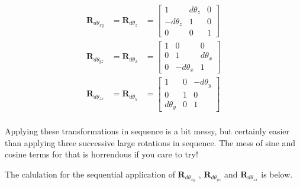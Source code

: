 \documentclass{article}      %
\newcommand{\BR}[0]{\mathbf{R}}
\begin{document}
\begin{align*}
\BR_{d\theta_{xy}}
&=
\BR_{d\theta_z}
&=
\begin{bmatrix}
1 & d\theta_z & 0 \\
-d\theta_z & 1 & 0 \\
0 & 0 & 1
\end{bmatrix} \\
\BR_{d\theta_{yz}}
&=
\BR_{d\theta_x}
&=
\begin{bmatrix}
 1 & 0 & 0 \\
 0 & 1 & d\theta_x \\
 0 & -d\theta_x & 1
\end{bmatrix} \\
\BR_{d\theta_{zx}}
&=
\BR_{d\theta_y}
&=
\begin{bmatrix}
 1 & 0 & -d\theta_y \\
 0 & 1 & 0 \\
 d\theta_y & 0 & 1
\end{bmatrix} \\
\end{align*}

Applying these transformations in sequence is a bit messy, but certainly easier than
applying three successive large rotations in sequence.  The mess of sine and cosine terms
for that is horrendous if you care to try!

The calulation for the sequential application of
$\BR_{d\theta_{xy}}$
,
$\BR_{d\theta_{yz}}$
and
$\BR_{d\theta_{zx}}$
is below.
\end{document}
